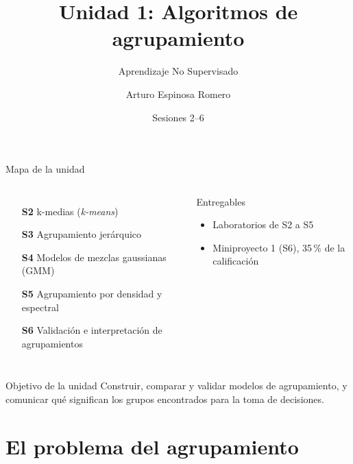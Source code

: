 \documentclass[aspectratio=169,11pt]{beamer}
\title[Unidad 1: Algoritmos de agrupamiento]{Unidad 1: Algoritmos de agrupamiento}
\subtitle{Aprendizaje No Supervisado}
\author[A. Espinosa Romero]{Arturo Espinosa Romero}
\institute[FMAT]{Maestría en Inteligencia Artificial \\ Facultad de Matemáticas}
\date{Sesiones 2--6}
\begin{document}
\begin{frame}
  \titlepage
\end{frame}

\begin{frame}{Mapa de la unidad}
  \begin{columns}[T]
    \begin{enumerate}
      \item[\textbf{S2}] k-medias (\emph{k-means})
      \item[\textbf{S3}] Agrupamiento jerárquico
      \item[\textbf{S4}] Modelos de mezclas gaussianas (GMM)
      \item[\textbf{S5}] Agrupamiento por densidad y espectral
      \item[\textbf{S6}] Validación e interpretación de agrupamientos
    \end{enumerate}
    \begin{block}{Entregables}
      \begin{itemize}
        \item Laboratorios de S2 a S5
        \item Miniproyecto 1 (S6), 35\,\% de la calificación
      \end{itemize}
    \end{block}
  \end{columns}
  \vspace{6pt}
  \begin{alertblock}{Objetivo de la unidad}
    Construir, comparar y validar modelos de agrupamiento, y comunicar qué
    significan los grupos encontrados para la toma de decisiones.
  \end{alertblock}
\end{frame}

\section{El problema del agrupamiento}
\end{document}
